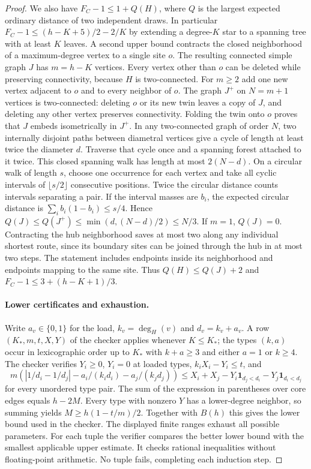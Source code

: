 \documentclass[11pt,a4paper]{article}
\begin{document}
\begin{proof}
We also have $F_C-1\le1+Q(H)$, where $Q$ is the largest expected ordinary
distance of two independent draws. In particular
$F_C-1\le(h-K+5)/2-2/K$ by extending a degree-$K$ star to a spanning tree
with at least $K$ leaves. A second upper bound contracts the closed neighborhood of a maximum-degree vertex to a single site $o$. The resulting connected simple graph $J$ has $m=h-K$ vertices. Every vertex other than $o$ can be deleted while preserving connectivity, because $H$ is two-connected. For $m\ge2$ add one new vertex adjacent to $o$ and to every neighbor of $o$. The graph $J^+$ on $N=m+1$ vertices is two-connected: deleting $o$ or its new twin leaves a copy of $J$, and deleting any other vertex preserves connectivity. Folding the twin onto $o$ proves that $J$ embeds isometrically in $J^+$. In any two-connected graph of order $N$, two internally disjoint paths between diametral vertices give a cycle of length at least twice the diameter $d$. Traverse that cycle once and a spanning forest attached to it twice. This closed spanning walk has length at most $2(N-d)$. On a circular walk of length $s$, choose one occurrence for each vertex and take all cyclic intervals of $\lfloor s/2\rfloor$ consecutive positions. Twice the circular distance counts intervals separating a pair. If the interval masses are $b_i$, the expected circular distance is $\sum_i b_i(1-b_i)\le s/4$. Hence $Q(J)\le Q(J^+)\le\min(d,(N-d)/2)\le N/3$. If $m=1$, $Q(J)=0$. Contracting the hub neighborhood saves at most two along any individual shortest route, since its boundary sites can be joined through the hub in at most two steps. The statement includes endpoints inside its neighborhood and endpoints mapping to the same site. Thus $Q(H)\le Q(J)+2$ and $F_C-1\le3+(h-K+1)/3$.

\paragraph{Lower certificates and exhaustion.}
Write $a_v\in\{0,1\}$ for the load, $k_v=\deg_H(v)$ and $d_v=k_v+a_v$.
A row $(K_*,m,t,X,Y)$ of the checker applies whenever $K\le K_*$;
the types $(k,a)$ occur in lexicographic order up to $K_*$ with
$k+a\ge3$ and either $a=1$ or $k\ge4$. The checker verifies
$Y_i\ge0$, $Y_i=0$ at loaded types, $k_iX_i-Y_i\le t$, and
\[
 m\left(|1/d_i-1/d_j|-a_i/(k_i d_i)-a_j/(k_j d_j)\right)
 \le X_i+X_j-Y_i\mathbf1_{d_j<d_i}-Y_j\mathbf1_{d_i<d_j}
\]
for every unordered type pair. The sum of the expression in
parentheses over core edges equals $h-2M$. Every type with nonzero
$Y$ has a lower-degree neighbor, so summing yields $M\ge h(1-t/m)/2$.
Together with $B(h)$ this gives the lower bound used in the checker.
The displayed finite ranges exhaust all possible parameters. For each
tuple the verifier compares the better lower bound with the smallest
applicable upper estimate. It checks rational inequalities without
floating-point arithmetic. No tuple fails, completing each induction
step.
\end{proof}
\end{document}
